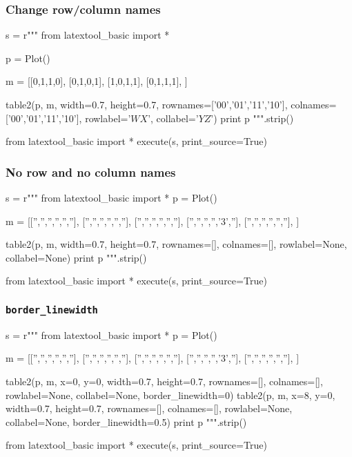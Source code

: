 \newpage
\subsubsection{Change row/column names}

\begin{python}
s = r"""
from latextool_basic import *

p = Plot()

m = [[0,1,1,0],
     [0,1,0,1],
     [1,0,1,1],
     [0,1,1,1],
     ]

table2(p, m, width=0.7, height=0.7,
       rownames=['00','01','11','10'],
       colnames=['00','01','11','10'],
       rowlabel='$WX$', collabel='$YZ$')      
print p
""".strip()

from latextool_basic import *
execute(s, print_source=True)
\end{python}





\newpage
\subsubsection{No row and no column names}

\begin{python}
s = r"""
from latextool_basic import *
p = Plot()

m = [['','','','','',''],
     ['','','','','',''],
     ['','','','','',''],
     ['','','','','3',''],
     ['','','','','',''],
     ]

table2(p, m, width=0.7, height=0.7,
       rownames=[],
       colnames=[],
       rowlabel=None, collabel=None)
print p
""".strip()

from latextool_basic import *
execute(s, print_source=True)
\end{python}



\newpage\subsubsection{\texttt{border\_linewidth}}

\begin{python}
s = r"""
from latextool_basic import *
p = Plot()

m = [['','','','','',''],
     ['','','','','',''],
     ['','','','','',''],
     ['','','','','3',''],
     ['','','','','',''],
     ]

table2(p, m, x=0, y=0, width=0.7, height=0.7,
       rownames=[],
       colnames=[],
       rowlabel=None, collabel=None, border_linewidth=0)
table2(p, m, x=8, y=0, width=0.7, height=0.7,
       rownames=[],
       colnames=[],
       rowlabel=None, collabel=None, border_linewidth=0.5)
print p
""".strip()

from latextool_basic import *
execute(s, print_source=True)
\end{python}





